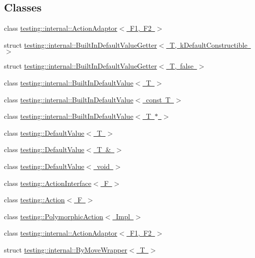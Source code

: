 \subsection*{Classes}
\begin{DoxyCompactItemize}
\item 
class \mbox{\hyperlink{classtesting_1_1internal_1_1ActionAdaptor}{testing\+::internal\+::\+Action\+Adaptor$<$ F1, F2 $>$}}
\item 
struct \mbox{\hyperlink{structtesting_1_1internal_1_1BuiltInDefaultValueGetter}{testing\+::internal\+::\+Built\+In\+Default\+Value\+Getter$<$ T, k\+Default\+Constructible $>$}}
\item 
struct \mbox{\hyperlink{structtesting_1_1internal_1_1BuiltInDefaultValueGetter_3_01T_00_01false_01_4}{testing\+::internal\+::\+Built\+In\+Default\+Value\+Getter$<$ T, false $>$}}
\item 
class \mbox{\hyperlink{classtesting_1_1internal_1_1BuiltInDefaultValue}{testing\+::internal\+::\+Built\+In\+Default\+Value$<$ T $>$}}
\item 
class \mbox{\hyperlink{classtesting_1_1internal_1_1BuiltInDefaultValue_3_01const_01T_01_4}{testing\+::internal\+::\+Built\+In\+Default\+Value$<$ const T $>$}}
\item 
class \mbox{\hyperlink{classtesting_1_1internal_1_1BuiltInDefaultValue_3_01T_01_5_01_4}{testing\+::internal\+::\+Built\+In\+Default\+Value$<$ T $\ast$ $>$}}
\item 
class \mbox{\hyperlink{classtesting_1_1DefaultValue}{testing\+::\+Default\+Value$<$ T $>$}}
\item 
class \mbox{\hyperlink{classtesting_1_1DefaultValue_3_01T_01_6_01_4}{testing\+::\+Default\+Value$<$ T \& $>$}}
\item 
class \mbox{\hyperlink{classtesting_1_1DefaultValue_3_01void_01_4}{testing\+::\+Default\+Value$<$ void $>$}}
\item 
class \mbox{\hyperlink{classtesting_1_1ActionInterface}{testing\+::\+Action\+Interface$<$ F $>$}}
\item 
class \mbox{\hyperlink{classtesting_1_1Action}{testing\+::\+Action$<$ F $>$}}
\item 
class \mbox{\hyperlink{classtesting_1_1PolymorphicAction}{testing\+::\+Polymorphic\+Action$<$ Impl $>$}}
\item 
class \mbox{\hyperlink{classtesting_1_1internal_1_1ActionAdaptor}{testing\+::internal\+::\+Action\+Adaptor$<$ F1, F2 $>$}}
\item 
struct \mbox{\hyperlink{structtesting_1_1internal_1_1ByMoveWrapper}{testing\+::internal\+::\+By\+Move\+Wrapper$<$ T $>$}}

\end{DoxyCompactItemize}
